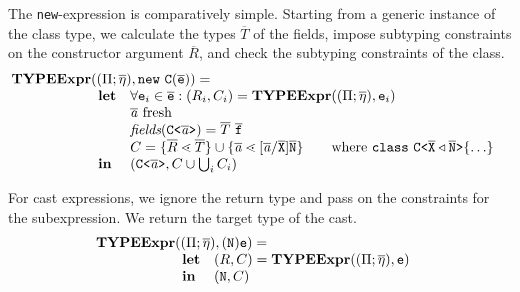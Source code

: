 \documentclass[a4paper,USenglish,cleveref, autoref, thm-restate, anonymous]{lipics-v2021}
\begin{document}
The \texttt{new}-expression is comparatively simple. Starting from a
generic instance of the class type, we calculate the types $\overline
T$ of the fields, impose subtyping constraints on the constructor
argument $\overline R$, and check the subtyping  constraints of the class.
\begin{gather*}
  \begin{array}{@{}l@{}l}
    \typeExpr &(({\mtypeEnvironment} ; 
                \overline{\localVarAssumption}), \mathtt{new }\ \texttt{C}(\ol{e}) ) = \\
              &\begin{array}{ll}
                 \textbf{let} %
                 & \forall \texttt{e}_i \in \overline{\texttt{e}} : (R_i, \consSet_i) = \typeExpr(({\mtypeEnvironment} ;
                   \overline{\localVarAssumption}), \texttt{e}_i)  \\
                 & \overline{\tv{a}} \text{ fresh} \\
                 & \textit{fields} (\exptype{C}{\overline{\tv{a}}}) = \overline{T}\ \ol{f} \\
                 & \consSet = \set{\overline{R} \lessdot \overline{T}}
                   \cup \set{\overline{\tv{a}} \lessdot
                   [\overline{\tv{a}}/\ol{X}]\ol{N}} 
                   \qquad\text{where}\ \texttt{class}\ \exptype{C}{\ol{X} \triangleleft \ol{N}} \set{\ldots} \\
                 \mathbf{in}& (\exptype{C}{\ol{\tv{a}}}, \consSet \cup \bigcup_i \consSet_i)
               \end{array}
  \end{array}
\end{gather*}

For cast expressions, we ignore the return type and pass on the
constraints for the subexpression. We return the target type of the cast.
\begin{gather*}
  \begin{array}{@{}l@{}l}
    \typeExpr &(({\mtypeEnvironment} ;
                \overline{\localVarAssumption}), (\texttt{N})\mv{e} ) = \\
              &\begin{array}{ll}
                 \textbf{let} %
                 & (R, \consSet) = \typeExpr(({\mtypeEnvironment} ;
                   \overline{\localVarAssumption}), \texttt{e})  \\
                 \mathbf{in} & (\mv{N}, \consSet)
               \end{array}
  \end{array}
\end{gather*}
\end{document}
